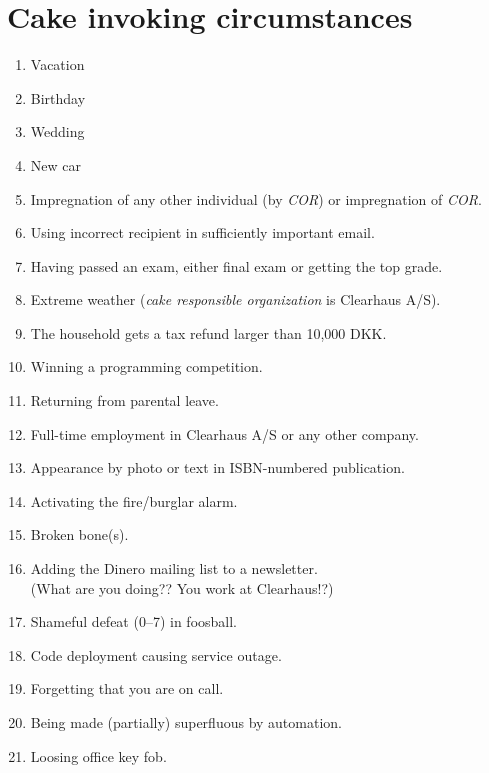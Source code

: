 \documentclass[a4paper, oneside, article]{memoir}
\newcounter{tbc}
\begin{document}
\chapter{Cake invoking circumstances}\label{chp:circumstances}
\begin{enumerate}[§ 1]
  \setcounter{enumi}{\value{tbc}}

  \item Vacation
  \item Birthday
  \item Wedding
  \item New car
  \item Impregnation of any other individual (by \emph{COR}) or impregnation of
    \emph{COR}.
  \item Using incorrect recipient in sufficiently important email.
  \item Having passed an exam, either final exam or getting the top grade.
  \item Extreme weather (\emph{cake responsible organization} is Clearhaus A/S).
  \item The household gets a tax refund larger than 10,000 DKK\@.
  \item Winning a programming competition.
  \item Returning from parental leave.
  \item Full-time employment in Clearhaus A/S or any other company.
  \item Appearance by photo or text in ISBN-numbered publication.
  \item Activating the fire/burglar alarm.
  \item Broken bone(s).
  \item Adding the Dinero mailing list to a newsletter.\\
    {\tiny (What are you doing?? You work at Clearhaus!?)}
  \item Shameful defeat (0--7) in foosball.
  \item Code deployment causing service outage.
  \item Forgetting that you are on call.
  \item Being made (partially) superfluous by automation.
  \item Loosing office key fob.
\end{enumerate}
\end{document}
